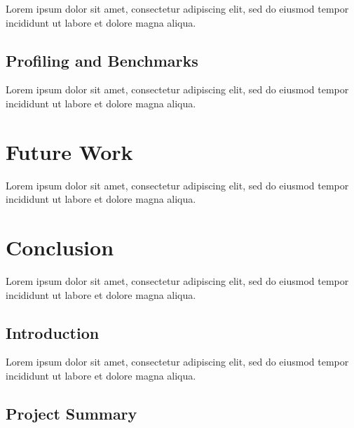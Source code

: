 \documentclass[12pt, a4paper]{article}
\begin{document}
Lorem ipsum dolor sit amet, consectetur adipiscing elit, sed do eiusmod tempor incididunt ut labore et dolore magna aliqua.


\subsection{Profiling and Benchmarks}

Lorem ipsum dolor sit amet, consectetur adipiscing elit, sed do eiusmod tempor incididunt ut labore et dolore magna aliqua.


\section{Future Work}

Lorem ipsum dolor sit amet, consectetur adipiscing elit, sed do eiusmod tempor incididunt ut labore et dolore magna aliqua.


\section{Conclusion}

Lorem ipsum dolor sit amet, consectetur adipiscing elit, sed do eiusmod tempor incididunt ut labore et dolore magna aliqua.


\subsection{Introduction}

Lorem ipsum dolor sit amet, consectetur adipiscing elit, sed do eiusmod tempor incididunt ut labore et dolore magna aliqua.


\subsection{Project Summary}

\end{document}
